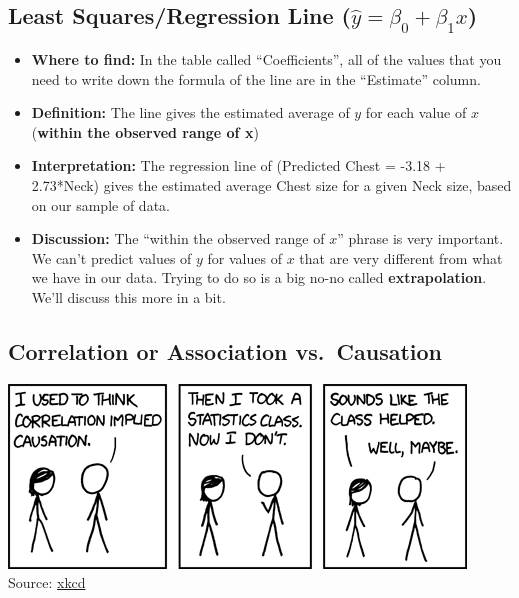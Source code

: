 \documentclass[]{book}
\providecommand{\tightlist}{%
  \setlength{\itemsep}{0pt}\setlength{\parskip}{0pt}}
\begin{document}
\hypertarget{least-squaresregression-line-haty-beta_0-beta_1x}{%
\subsection{\texorpdfstring{Least Squares/Regression Line (\(\hat{y} = \beta_0 + \beta_1x\))}{Least Squares/Regression Line (\textbackslash{}hat\{y\} = \textbackslash{}beta\_0 + \textbackslash{}beta\_1x)}}\label{least-squaresregression-line-haty-beta_0-beta_1x}}

\begin{itemize}
\tightlist
\item
  \textbf{Where to find:} In the table called ``Coefficients'', all of the values that you need to write down the formula of the line are in the ``Estimate'' column.
\item
  \textbf{Definition:} The line gives the estimated average of \(y\) for each value of \(x\) (\textbf{within the observed range of x})
\item
  \textbf{Interpretation:} The regression line of (Predicted Chest = -3.18 + 2.73*Neck) gives the estimated average Chest size for a given Neck size, based on our sample of data.
\item
  \textbf{Discussion:} The ``within the observed range of \(x\)'' phrase is very important. We can't predict values of \(y\) for values of \(x\) that are very different from what we have in our data. Trying to do so is a big no-no called \textbf{extrapolation}. We'll discuss this more in a bit.
\end{itemize}

\hypertarget{correlation-or-association-vs.causation}{%
\subsection{Correlation or Association vs.~Causation}\label{correlation-or-association-vs.causation}}

\includegraphics{Photos/correlation.png}
Source: \href{https://xkcd.com/552/}{xkcd}
\end{document}
